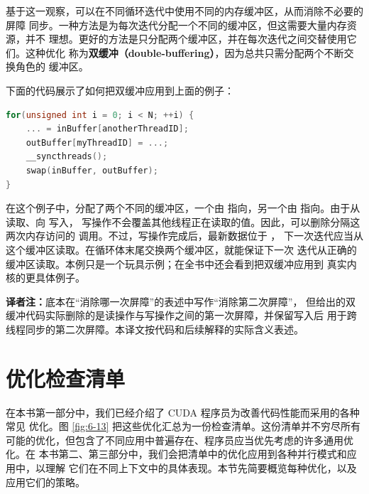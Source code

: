 基于这一观察，可以在不同循环迭代中使用不同的内存缓冲区，从而消除不必要的屏障
同步。一种方法是为每次迭代分配一个不同的缓冲区，但这需要大量内存资源，并不
理想。更好的方法是只分配两个缓冲区，并在每次迭代之间交替使用它们。这种优化
称为\textbf{双缓冲（double-buffering）}，因为总共只需分配两个不断交换角色的
缓冲区。

下面的代码展示了如何把双缓冲应用到上面的例子：

\noindent\begin{minipage}{\linewidth}
\begin{lstlisting}[language=C++]
for(unsigned int i = 0; i < N; ++i) {
    ... = inBuffer[anotherThreadID];
    outBuffer[myThreadID] = ...;
    __syncthreads();
    swap(inBuffer, outBuffer);
}
\end{lstlisting}
\end{minipage}

在这个例子中，分配了两个不同的缓冲区，一个由  指向，另一个由
 指向。由于从  读取、向  写入，
写操作不会覆盖其他线程正在读取的值。因此，可以删除分隔这两次内存访问的
 调用。不过，写操作完成后，最新数据位于 ，
下一次迭代应当从这个缓冲区读取。在循环体末尾交换两个缓冲区，就能保证下一次
迭代从正确的缓冲区读取。本例只是一个玩具示例；在全书中还会看到把双缓冲应用到
真实内核的更具体例子。

\noindent\textbf{译者注：}底本在“消除哪一次屏障”的表述中写作“消除第二次屏障”，
但给出的双缓冲代码实际删除的是读操作与写操作之间的第一次屏障，并保留写入后
用于跨线程同步的第二次屏障。本译文按代码和后续解释的实际含义表述。

\section{优化检查清单}
\label{sec:optimization-checklist}

在本书第一部分中，我们已经介绍了 CUDA 程序员为改善代码性能而采用的各种常见
优化。图 \ref{fig:6-13} 把这些优化汇总为一份检查清单。这份清单并不穷尽所有
可能的优化，但包含了不同应用中普遍存在、程序员应当优先考虑的许多通用优化。在
本书第二、第三部分中，我们会把清单中的优化应用到各种并行模式和应用中，以理解
它们在不同上下文中的具体表现。本节先简要概览每种优化，以及应用它们的策略。

